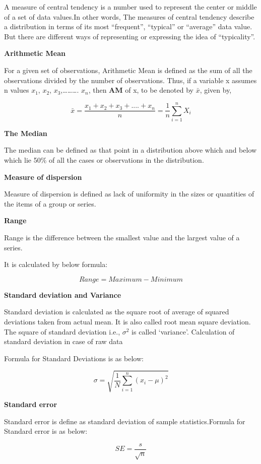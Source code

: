 \documentclass[12pt,openany]{book}
\begin{document}
A measure of central tendency is a number used to represent the center or middle of a set of data values.In other words, The measures of central tendency describe a distribution in terms of its most ``frequent'', ``typical'' or ``average'' data value. But there are different ways of representing or expressing the idea of ``typicality''.

\textbf{Arithmetic Mean}

For a given set of observations, Arithmetic Mean is defined as the sum of all the observations divided by the number of observations. Thus, if a variable x assumes n values \(x_1\), \(x_2\), \(x_3\),\ldots{}\ldots{}\ldots{}. \(x_n\), then \textbf{AM} of x, to be denoted by \(\bar{x}\), given by,

\[\bar{x} = \frac{x_1 + x_2 + x_3 + ....+ x_n}{n}
    = \frac{1}{n} \sum_{i=1}^n X_i\]

\textbf{The Median}

The median can be defined as that point in a distribution above which and below which lie 50\% of all the cases or observations in the distribution.

\textbf{Measure of dispersion}

Measure of dispersion is defined as lack of uniformity in the sizes or quantities of the items of a group or series.

\textbf{Range}

Range is the difference between the smallest value and the largest value of a series.

It is calculated by below formula:

\[Range = Maximum - Minimum\]

\textbf{Standard deviation and Variance}

Standard deviation is calculated as the square root of average of squared deviations taken from actual mean. It is also called root mean square deviation. The square of standard deviation i.e., \(\sigma^2\) is called `variance'.
Calculation of standard deviation in case of raw data

Formula for Standard Deviations is as below:

\[ \sigma = \sqrt{\frac{1}{N}\sum_{i=1}^{n}(x_i - \mu)^2 }\]

\textbf{Standard error}

Standard error is define as standard deviation of sample statistics.Formula for Standard error is as below:

\[ SE = \frac{s}{\sqrt{n}}\]
\end{document}
